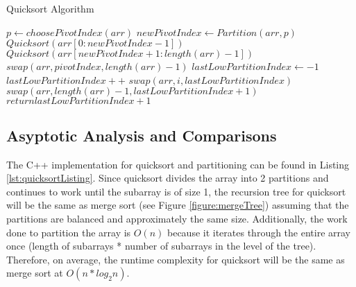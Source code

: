 \documentclass[letterpaper, 10pt,DIV=13]{scrartcl}
\numberwithin{equation}{section} %
\numberwithin{figure}{section} %
\numberwithin{table}{section} %
\begin{document}
\begin{algorithm}
  \caption{Quicksort Algorithm}
  \label{algorithm:quicksort}
  \begin{algorithmic}[1]
         
          \State $p \gets choosePivotIndex(arr)$ 
          \State $newPivotIndex \gets Partition(arr, p)$ 
          \State $Quicksort(arr[0:newPivotIndex - 1])$ 
          \State $Quicksort(arr[newPivotIndex + 1:length(arr) - 1])$ 
        \EndIf
      \EndProcedure
      \\
        \State $swap(arr, pivotIndex, length(arr) - 1)$ 
        \State $lastLowPartitionIndex \gets -1$ 
         
            \State $lastLowPartitionIndex++$ 
            \State $swap(arr, i, lastLowPartitionIndex)$ 
          \EndIf
        \EndFor
        \State $swap(arr, length(arr) - 1, lastLowPartitionIndex + 1)$ 
        \State $return lastLowPartitionIndex + 1$
      \EndProcedure
  \end{algorithmic}
\end{algorithm}

\subsection{Asyptotic Analysis and Comparisons}\label{quicksortAnalysis}
The C++ implementation for quicksort and partitioning can be found in Listing \ref{lst:quicksortListing}. Since quicksort divides the array into 2 partitions and continues to work until the subarray is of size 1, the recursion tree for quicksort will be the same as merge sort (see Figure \ref{figure:mergeTree}) assuming that the partitions are balanced and approximately the same size. Additionally, the work done to partition the array is $O(n)$ because it iterates through the entire array once (length of subarrays * number of subarrays in the level of the tree). Therefore, on average, the runtime complexity for quicksort will be the same as merge sort at $O(n * log_2n)$.
\end{document}
